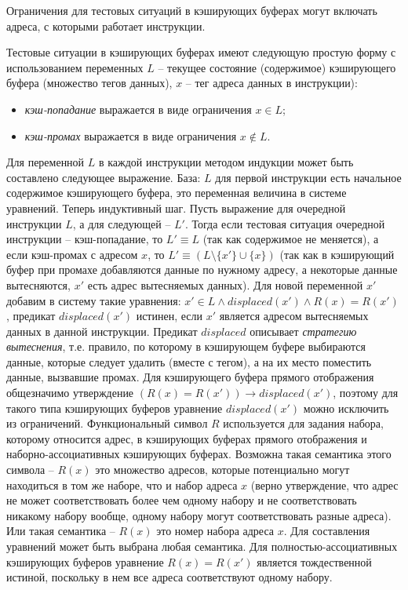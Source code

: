 Ограничения для тестовых ситуаций в кэширующих буферах могут
включать адреса, с которыми работает инструкции.

\begin{utv}\label{hit_miss_simpleform}
Тестовые ситуации в кэширующих буферах имеют следующую простую форму
с использованием переменных $L$ -- текущее состояние (содержимое)
кэширующего буфера (множество тегов данных), $x$ -- тег адреса
данных в инструкции):
\begin{itemize}
\item \emph{кэш-попадание} выражается в виде ограничения $x \in L$;
\item \emph{кэш-промах} выражается в виде ограничения $x \notin L$.
\end{itemize}
\end{utv}

Для переменной $L$ в каждой инструкции методом индукции может быть
составлено следующее выражение. База: $L$ для первой инструкции есть
начальное содержимое кэширующего буфера, это переменная величина в
системе уравнений. Теперь индуктивный шаг. Пусть выражение для
очередной инструкции $L$, а для следующей -- $L'$. Тогда если
тестовая ситуация очередной инструкции -- кэш-попадание, то $L'
\equiv L$ (так как содержимое не меняется), а если кэш-промах с
адресом $x$, то $L' \equiv (L \setminus \{x'\} \cup \{x\})$ (так как
в кэширующий буфер при промахе добавляются данные по нужному адресу,
а некоторые данные вытесняются, $x'$ есть адрес вытесняемых данных).
Для новой переменной $x'$ добавим в систему такие уравнения: $x' \in
L \wedge displaced(x') \wedge R(x) = R(x')$, предикат
$displaced(x')$ истинен, если $x'$ является адресом вытесняемых
данных в данной инструкции. Предикат $displaced$ описывает
\emph{стратегию вытеснения}, т.е. правило, по которому в кэширующем
буфере выбираются данные, которые следует удалить (вместе с тегом),
а на их место поместить данные, вызвавшие промах. Для кэширующего
буфера прямого отображения общезначимо утверждение $(R(x) = R(x'))
\rightarrow displaced(x')$, поэтому для такого типа кэширующих
буферов уравнение $displaced(x')$ можно исключить из ограничений.
Функциональный символ $R$ используется для задания набора, которому
относится адрес, в кэширующих буферах прямого отображения и
наборно-ассоциативных кэширующих буферах. Возможна такая семантика
этого символа -- $R(x)$ это множество адресов, которые потенциально
могут находиться в том же наборе, что и набор адреса $x$ (верно
утверждение, что адрес не может соответствовать более чем одному
набору и не соответствовать никакому набору вообще, одному набору
могут соответствовать разные адреса). Или такая семантика -- $R(x)$
это номер набора адреса $x$. Для составления уравнений может быть
выбрана любая семантика. Для полностью-ассоциативных кэширующих
буферов уравнение $R(x) = R(x')$ является тождественной истиной,
поскольку в нем все адреса соответствуют одному набору.

